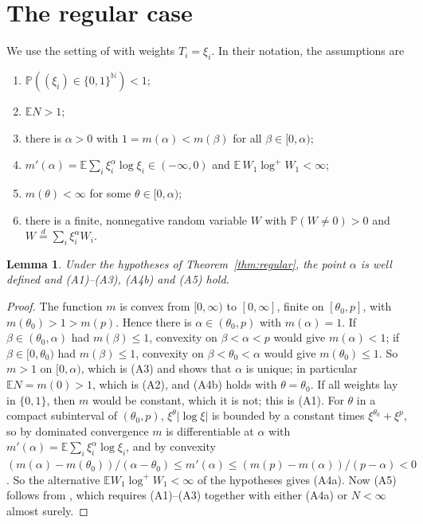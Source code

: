 \documentclass[11pt]{amsart}
\newtheorem{lemma}[theorem]{Lemma}
\theoremstyle{remark}
\newcommand{\N}{\mathbb{N}}
\newcommand{\Pb}{\mathbb{P}}
\newcommand{\E}{\mathbb{E}}
\begin{document}
\section{The regular case}\label{sec:regular}

We use the setting of \cite{ABM} with weights $T_i=\xi_i$. In their notation, the
assumptions are
\begin{enumerate}
\item[(A1)] $\Pb((\xi_i)\in\{0,1\}^{\N})<1$;
\item[(A2)] $\E N>1$;
\item[(A3)] there is $\alpha>0$ with $1=m(\alpha)<m(\beta)$ for all $\beta\in[0,\alpha)$;
\item[(A4a)] $m'(\alpha)=\E\sum_i\xi_i^{\alpha}\log\xi_i\in(-\infty,0)$ and
$\E\,W_1\log^+W_1<\infty$;
\item[(A4b)] $m(\theta)<\infty$ for some $\theta\in[0,\alpha)$;
\item[(A5)] there is a finite, nonnegative random variable $W$ with $\Pb(W\ne0)>0$ and
$W\stackrel{d}{=}\sum_i\xi_i^{\alpha}W_i$.
\end{enumerate}

\begin{lemma}\label{lem:assumptions}
Under the hypotheses of Theorem~\ref{thm:regular}, the point $\alpha$ is well defined and
(A1)--(A3), (A4b) and (A5) hold.
\end{lemma}

\begin{proof}
The function $m$ is convex from $[0,\infty)$ to $[0,\infty]$, finite on $[\theta_0,p]$, with
$m(\theta_0)>1>m(p)$. Hence there is $\alpha\in(\theta_0,p)$ with $m(\alpha)=1$. If
$\beta\in(\theta_0,\alpha)$ had $m(\beta)\le1$, convexity on $\beta<\alpha<p$ would give
$m(\alpha)<1$; if $\beta\in[0,\theta_0)$ had $m(\beta)\le 1$, convexity on
$\beta<\theta_0<\alpha$ would give $m(\theta_0)\le1$. So $m>1$ on $[0,\alpha)$, which is
(A3) and shows that $\alpha$ is unique; in particular $\E N=m(0)>1$, which is (A2), and
(A4b) holds with $\theta=\theta_0$. If all weights lay in $\{0,1\}$, then $m$ would be
constant, which it is not; this is (A1). For $\theta$ in a compact subinterval of
$(\theta_0,p)$, $\xi^\theta|\log\xi|$ is bounded by a constant times
$\xi^{\theta_0}+\xi^{p}$, so by dominated convergence $m$ is differentiable at $\alpha$
with $m'(\alpha)=\E\sum_i\xi_i^\alpha\log\xi_i$, and by
convexity $(m(\alpha)-m(\theta_0))/(\alpha-\theta_0)\le m'(\alpha)\le
(m(p)-m(\alpha))/(p-\alpha)<0$. So the alternative $\E W_1\log^+W_1<\infty$ of the
hypotheses gives (A4a). Now (A5) follows from \cite[Proposition~2.1]{ABM}, which requires
(A1)--(A3) together with either (A4a) or $N<\infty$ almost surely.
\end{proof}
\end{document}
